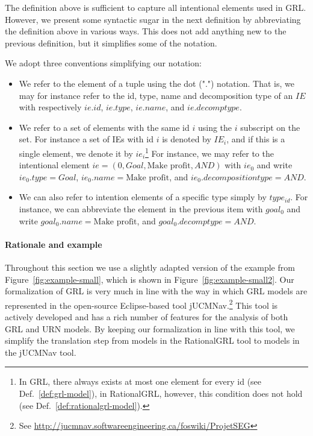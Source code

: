 The definition above is sufficient to capture all intentional elements used in GRL. However, we present some syntactic sugar in the next definition by abbreviating the definition above in various ways. This does not add anything new to the previous definition, but it simplifies some of the notation.

\begin{definition}[Notation]
\label{def:notation}
We adopt three conventions simplifying our notation:
\begin{itemize}
\item
We refer to the element of a tuple using the dot (".") notation. That is, we may for instance refer to the id, type, name and decomposition type of an $IE$ with respectively $ie.id$, $ie.type$, $ie.name$, and $ie.decomptype$.
\item 
We refer to a set of elements with the same id $i$  using the $i$ subscript on the set. For instance a set of IEs with id $i$ is denoted by $IE_i$, and if this is a single element, we denote it by $ie_i$\footnote{In GRL, there always exists at most one element for every id (see Def.~\ref{def:grl-model}), in RationalGRL, however, this condition does not hold (see Def.~\ref{def:rationalgrl-model}).} For instance, we may refer to the intentional element $ie = (0, Goal, \text{Make profit}, AND)$ with $ie_0$ and write $ie_0.type = Goal$, $ie_0.name = \text{Make profit}$, and $ie_0.decompositiontype = AND$. 
\item
We can also refer to intention elements of a specific type simply by $type_{id}$. For instance, we can abbreviate the element in the previous item with $goal_0$ and write $goal_0.name = \text{Make profit}$, and $goal_0.decomptype = AND$.
\end{itemize}
\end{definition}

\paragraph{Rationale and example} Throughout this section we use a slightly adapted version of the example from Figure~\ref{fig:example-small}, which is shown in Figure~\ref{fig:example-small2}. Our formalization of GRL is very much in line with the way in which GRL models are represented in the open-source Eclipse-based tool jUCMNav.\footnote{See \url{http://jucmnav.softwareengineering.ca/foswiki/ProjetSEG}} This tool is actively developed and has a rich number of features for the analysis of both GRL and URN models. By keeping our formalization in line with this tool, we simplify the translation step from models in the RationalGRL tool to models in the jUCMNav tool.

